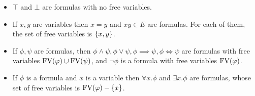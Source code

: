 \begin{itemize}
	\item $\top$ and $\bot$ are formulas with no free variables.
	\item If $x,y$ are variables then $x=y$ and $xy\in E$ are formulas. For each of them, the set of free variables is $\{x,y\}$.
	\item If $\phi,\psi$ are formulas, then $\phi\land \psi,\phi\lor\psi,\phi\implies\psi,\phi\iff\psi$ are formulas with free variables $\textrm{FV}(\varphi)\cup\textrm{FV}(\psi)$, and $\neg\phi$ is a formula with free variables $\textrm{FV}(\varphi)$.	
	
	\item If $\phi$ is a formula and $x$ is a variable then $\forall x.\phi$ and $\exists x. \phi$ are formulas, whose set of free variables is $\textrm{FV}(\varphi)-\{x\}$.
\end{itemize}



